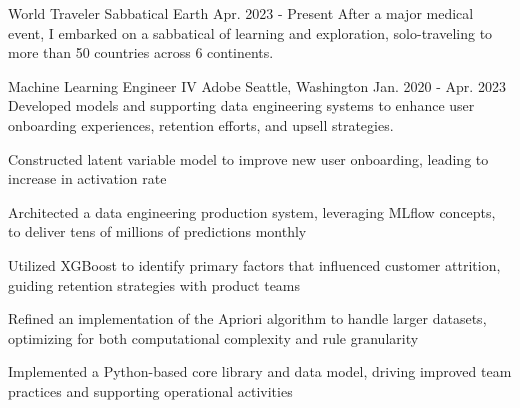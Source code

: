 

\begin{cventries}

\cventry
    {World Traveler} %
    {Sabbatical} %
    {Earth} %
    {Apr. 2023 - Present} %
    {After a major medical event, I embarked on a sabbatical of learning and exploration, solo-traveling to more than 50 countries across 6 continents.} %
    {}

\cventry
    {Machine Learning Engineer IV} %
    {Adobe} %
    {Seattle, Washington} %
    {Jan. 2020 - Apr. 2023} %
    {Developed models and supporting data engineering systems to enhance user onboarding experiences, retention efforts, and upsell strategies.} %
    {
      \begin{cvitems} %
        \item {Constructed latent variable model to improve new user onboarding, leading to increase in activation rate}
        \item {Architected a data engineering production system, leveraging MLflow concepts, to deliver tens of millions of predictions monthly}
        \item {Utilized XGBoost to identify primary factors that influenced customer attrition, guiding retention strategies with product teams}
        \item {Refined an implementation of the Apriori algorithm to handle larger datasets, optimizing for both computational complexity and rule granularity}
        \item {Implemented a Python-based core library and data model, driving improved team practices and supporting operational activities}
      \end{cvitems}
    }


\end{cventries}
